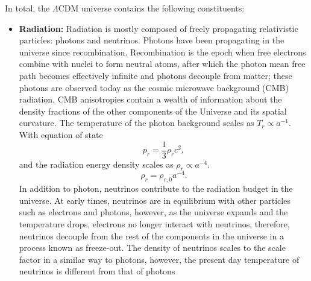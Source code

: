 In total, the $\Lambda$CDM universe contains the following constituents:
\begin{itemize}
    \item \textbf{Radiation:} Radiation is mostly composed of freely propagating relativistic particles: photons and neutrinos. Photons have been propagating in the universe since recombination. Recombination is the epoch when free electrons combine with nuclei to form neutral atoms, after which the photon mean free path becomes effectively infinite and photons decouple from matter; these photons are observed today as the cosmic microwave background (CMB) radiation. CMB anisotropies contain a wealth of information about the density fractions of the other components of the Universe and its spatial curvature. The temperature of the photon background scales as $T_{r} \propto a^{-1}$. With equation of state
    \begin{equation}
        p_r = \frac{1}{3} \rho_{r} c^2,
    \end{equation}
    and the radiation energy density scales as $\rho_{r} \propto a^{-4}$.
    \begin{equation}
        \rho_{r} = \rho_{r,0} a^{-4}.
    \end{equation}
    In addition to photon, neutrinos contribute to the radiation budget in the universe. At early times, neutrinos are in equilibrium with other particles such as electrons and photons, however, as the universe expands and the temperature drops, electrons no longer interact with neutrinos, therefore, neutrinos decouple from the rest of the components in the universe in a process known as freeze-out. The density of neutrinos scales to the scale factor in a similar way to photons, however, the present day temperature of neutrinos is different from that of photons  



\end{itemize}
